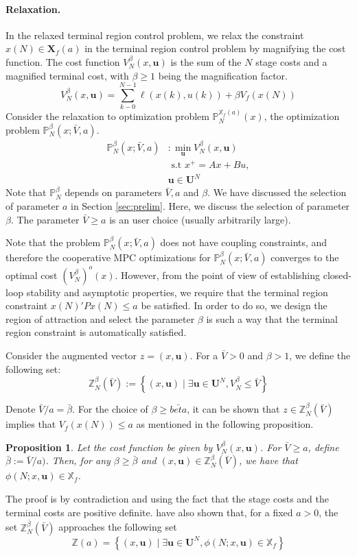 \documentclass[10pt, twocolumn]{article}
\newcommand{\bu}{\mathbf{u}}
\newcommand{\set}[1]{\left\lbrace #1 \right\rbrace}
\newtheorem{proposition}{Proposition}
\theoremstyle{definition}
\begin{document}
\paragraph{\textbf{Relaxation.}}
 In the relaxed terminal
 region control problem, we relax the constraint $x(N) \in
 \mathbf{X}_f(a)$ in the terminal region control problem by magnifying
 the cost function. The cost function $V_N^\beta(x,\bu)$ is the sum of the $N$ stage costs and a magnified terminal cost, with $\beta \geq 1$ being the magnification factor.
\[V_N^\beta(x,\bu) = \sum_{k-0}^{N-1} \ell(x(k),u(k)) + \beta
V_f(x(N)) \]
Consider the relaxation to optimization problem $\mathbb{P}_N^{\mathbb{X}_f(a)}(x)$, the optimization problem $\mathbb{P}_N^\beta(x;\bar{V},a)$.
\begin{align*} \mathbb{P}_N^{\beta}(x;\bar{V},a) &: \min_{\bu}{V_N^\beta(x,\bu)}\\& \text{~s.t~} x^+ = Ax+Bu,\\& \bu \in \mathbf{U}^N\end{align*}
Note that $\mathbb{P}_N^\beta$ depends on parameters $\bar{V},a$ and
$\beta$. We have discussed the selection of parameter $a$ in Section
\ref{sec:prelim}. Here, we discuss the selection of parameter
$\beta$. The parameter $\bar{V} \geq a $ is an user choice (usually arbitrarily large).

Note that the problem $\mathbb{P}_N^\beta(x;\bar{V},a)$ does not have
coupling constraints, and therefore the cooperative MPC optimizations
for $\mathbb{P}_N^\beta(x;\bar{V},a)$ converges to the optimal cost
$(V_N^\beta)^o(x)$. However, from the point of view of establishing
closed-loop stability and asymptotic properties, we require that the
terminal region constraint $x(N)'Px(N)\leq a$ be satisfied. In order
to do so, we design the region of attraction and select the parameter
$\beta$ is such a way that the terminal region constraint is
automatically satisfied.

Consider the augmented vector $z = (x,\bu)$. For a $\bar{V} >0$ and
$\beta > 1$, we
define the following set:
\[ \mathbb{Z}_N^\beta(\bar{V}) := \set{(x,\bu) \mid \exists \bu \in
\mathbf{U}^N, V_N^\beta \leq \bar{V}}
\]

Denote $\bar{V}/a = \bar{\beta}$. For the choice of $\beta \geq
\bar{beta}$, it can be shown that $z \in \mathbb{Z}_N^\beta(\bar{V})$ implies
that $V_f(x(N)) \leq a$ as mentioned in the following proposition.

\begin{proposition}
\label{prop:betabar}
Let the cost function be given by $V_N^{\beta}(x,\bu)$. For  $\bar{V}
\geq a $, define $\bar{\beta} := \bar{V}/a)$. Then, for any $\beta \geq \bar{\beta}$ and $(x,\bu) \in \mathbb{Z}_N^\beta(\bar{V})$, we have that $\phi(N;x,\bu) \in \mathbb{X}_f$. 
\end{proposition}
 The proof is by contradiction and  using the fact
that the stage costs and the terminal costs are positive definite.
\citet{pannocchia:rawlings:wright:2011} have also shown that, for a fixed $a>0$, the set
$\mathbb{Z}_N^{\bar{\beta}}(\bar{V})$ approaches the following set
\[ \mathbb{Z}(a) = \set{(x,\bu) \mid \exists \bu \in \mathbf{U}^N,
  \phi(N;x,\bu) \in \mathbb{X}_f}
\]
\end{document}
